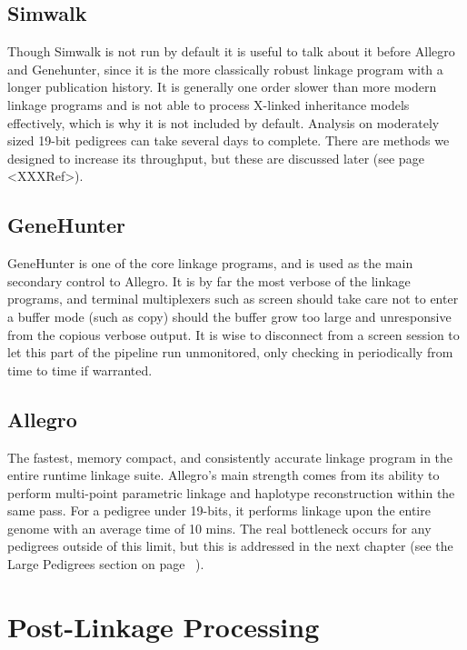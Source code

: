 \subsection{Simwalk}

Though Simwalk is not run by default it is useful to talk about it before Allegro and Genehunter, since it is the more classically robust linkage program with a longer publication history. It is generally one order slower than more modern linkage programs and is not able to process X-linked inheritance models effectively, which is why it is not included by default.  Analysis on moderately sized 19-bit pedigrees can take several days to complete. There are methods we designed to increase its throughput, but these are discussed later (see page <XXXRef>). 


\subsection{GeneHunter}

GeneHunter is one of the core linkage programs, and is used as the main secondary control to Allegro. It is by far the most verbose of the linkage programs, and terminal multiplexers such as screen should take care not to enter a buffer mode (such as copy) should the buffer grow too large and unresponsive from the copious verbose output. It is wise to disconnect from a screen session to let this part of the pipeline run unmonitored, only checking in periodically from time to time if warranted.

\subsection{Allegro}

The fastest, memory compact, and consistently accurate linkage program in the entire runtime linkage suite. Allegro’s main strength comes from its ability to perform multi-point parametric linkage and haplotype reconstruction within the same pass. For a pedigree under 19-bits, it performs linkage upon the entire genome with an average time of 10 mins. The real bottleneck occurs for any pedigrees outside of this limit, but this is addressed in the next chapter (see the Large Pedigrees section on page~\pageref{ref:meth:largepeds} ).


\section{Post-Linkage Processing}

